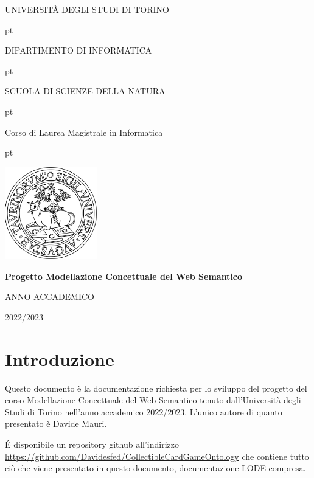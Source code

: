 \documentclass[12pt]{article}
\author{Davide Mauri}
\date{January 2023}
\begin{document}
\begin{titlepage}

\thispagestyle{empty}

\centerline {\Large{\MakeUppercase{ Università DEGLI STUDI DI TORINO}}}
 pt

\centerline {\Large{\textsc DIPARTIMENTO DI INFORMATICA}}

 pt

\centerline {{\textsc SCUOLA DI SCIENZE DELLA NATURA}}

 pt

\centerline {\Large{\textsc Corso di Laurea Magistrale in Informatica}}

 pt


\centerline {\includegraphics[width=4cm]{files/Unito-logo.png}}

\vskip 2cm

\centerline {\Large {\bf Progetto Modellazione Concettuale del Web Semantico}}

\vskip 1.7cm


\vskip 2.7cm


\centerline{ANNO ACCADEMICO}
\vskip 0.1cm
\centerline{2022/2023}

\end{titlepage}

\tableofcontents

\newpage
\section{Introduzione}
Questo documento è la documentazione richiesta per lo sviluppo del progetto del corso Modellazione Concettuale del Web Semantico tenuto dall'Università degli Studi di Torino nell'anno accademico 2022/2023. L'unico autore di quanto presentato è Davide Mauri.

\'E disponibile un repository github all'indirizzo \url{https://github.com/Davidesfed/CollectibleCardGameOntology} che contiene tutto ciò che viene presentato in questo documento, documentazione LODE compresa.
\end{document}
